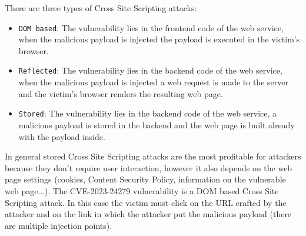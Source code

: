 \documentclass[a4paper,10pt]{memoir}
\begin{document}
There are three types of Cross Site Scripting attacks:
\begin{itemize}
    \item \texttt{DOM based}: The vulnerability lies in the frontend code of the web service, when the malicious payload is injected the payload is executed in the victim's browser.
    \item \texttt{Reflected}: The vulnerability lies in the backend code of the web service, when the malicious payload is injected a web request is made to the server and the victim's browser renders the resulting web page.
    \item \texttt{Stored}: The vulnerability lies in the backend code of the web service, a malicious payload is stored in the backend and the web page is built already with the payload inside.
\end{itemize}

In general stored Cross Site Scripting attacks are the most profitable for attackers because they don't require user interaction, however it also depends on the web page settings (cookies, Content Security Policy, information on the vulnerable web page...). The CVE-2023-24279 vulnerability is a DOM based Cross Site Scripting attack. In this case the victim must click on the URL crafted by the attacker and on the link in which the attacker put the malicious payload (there are multiple injection points).
\medskip
\end{document}
